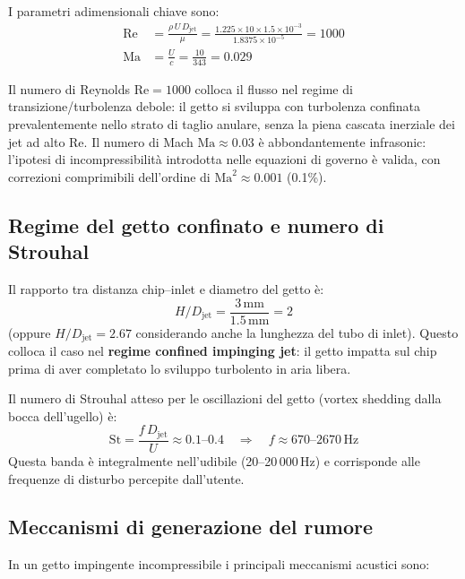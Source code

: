 \documentclass[11pt,a4paper]{article}
\newcommand{\Djet}{D_{\mathrm{jet}}}
\newcommand{\Rey}{\mathrm{Re}}
\newcommand{\Ma}{\mathrm{Ma}}
\newcommand{\Str}{\mathrm{St}}
\begin{document}
I parametri adimensionali chiave sono:
\begin{align}
  \Rey &= \frac{\rho\, U\, \Djet}{\mu}
       = \frac{1.225 \times 10 \times 1.5\times10^{-3}}{1.8375\times10^{-5}}
       = 1000 \label{eq:re} \\
  \Ma  &= \frac{U}{c}
       = \frac{10}{343}
       = 0.029 \label{eq:ma}
\end{align}

Il numero di Reynolds $\Rey = 1000$ colloca il flusso nel regime di transizione/turbolenza debole: il getto si sviluppa con turbolenza confinata prevalentemente nello strato di taglio anulare, senza la piena cascata inerziale dei jet ad alto Re. Il numero di Mach $\Ma \approx 0.03$ è abbondantemente infrasonic: l'ipotesi di incompressibilità introdotta nelle equazioni di governo è valida, con correzioni comprimibili dell'ordine di $\Ma^2 \approx 0.001$ (0.1\%).

\subsection{Regime del getto confinato e numero di Strouhal}

Il rapporto tra distanza chip--inlet e diametro del getto è:
\begin{equation}
  H/\Djet = \frac{3\,\text{mm}}{1.5\,\text{mm}} = 2
\end{equation}
(oppure $H/\Djet = 2.67$ considerando anche la lunghezza del tubo di inlet). Questo colloca il caso nel \textbf{regime confined impinging jet}: il getto impatta sul chip prima di aver completato lo sviluppo turbolento in aria libera.

Il numero di Strouhal atteso per le oscillazioni del getto (vortex shedding dalla bocca dell'ugello) è:
\begin{equation}
  \Str = \frac{f\,\Djet}{U} \approx 0.1\text{--}0.4
  \quad\Rightarrow\quad
  f \approx 670\text{--}2670\,\text{Hz}
\end{equation}
Questa banda è integralmente nell'udibile (20--20\,000\,Hz) e corrisponde alle frequenze di disturbo percepite dall'utente.

\subsection{Meccanismi di generazione del rumore}

In un getto impingente incompressibile i principali meccanismi acustici sono:
\end{document}
